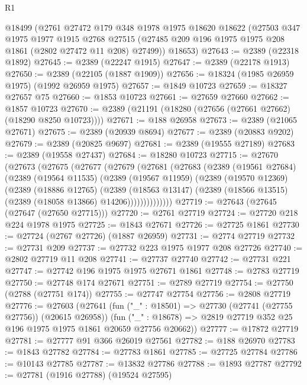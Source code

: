\begin{lexlean}{R1}
\begin{coremodule}
    @18499
    (@2761
      @27472
      @179
      @348
      @1978
      @1975
      @18620
      @18622
      (@27503
        @347
        @1975
        @1977
        @1915
        @2768
        @27515
        (@27485 @209 @196 @1975 @1975 @208 @1861 (@2802 @27472 @11 @208) @27499))
      @18653)
@27643 := @2389 (@22318 @1892)
@27645 := @2389 (@22247 @1915)
@27647 := @2389 (@22178 @1913)
@27650 := @2389 (@22105 (@1887 @1909))
@27656 := @18324 (@1985 @26959 @1975) (@1992 @26959 @1975)
@27657 := @1849 @10723
@27659 := @18327 @27657 @75
@27660 := @1853 @10723
@27661 := @27659 @27660
@27662 := @1857 @10723
@27670 := @2389 (@21191 (@18280 (@27656 (@27661 @27662) (@18290 @8250 @10723))))
@27671 := @188 @26958
@27673 := @2389 (@21065 @27671)
@27675 := @2389 (@20939 @8694)
@27677 := @2389 (@20883 @9202)
@27679 := @2389 (@20825 @9697)
@27681 := @2389 (@19555 @27189)
@27683 := @2389 (@19558 @27437)
@27684 := @18280 @10723
@27715 := @27670
    (@27673
      (@27675
        (@27677
          (@27679
            (@27681
              (@27683
                (@2389
                  (@19561 @27684)
                  (@2389
                    (@19564 @11535)
                    (@2389
                      (@19567 @11959)
                      (@2389
                        (@19570 @12369)
                        (@2389
                          (@18886 @12765)
                          (@2389
                            (@18563 @13147)
                            (@2389 (@18566 @13515) (@2389 (@18058 @13866) @14206))))))))))))))
@27719 := @27643 (@27645 (@27647 (@27650 @27715)))
@27720 := @2761 @27719
@27724 := @27720 @218 @224 @1978 @1975
@27725 := @1843 @27671
@27726 := @27725 @1861
@27730 := @27724 (@2767 @27726) (@1887 @26959)
@27731 := @2774 @27719
@27732 := @27731 @209
@27737 := @27732 @223 @1975 @1977 @208 @27726
@27740 := @2802 @27719 @11 @208
@27741 := @27737 @27740
@27742 := @27731 @221
@27747 := @27742 @196 @1975 @1975 @27671 @1861
@27748 := @2783 @27719
@27750 := @27748 @174 @27671
@27751 := @2789 @27719
@27754 := @27750 (@2788 (@27751 @174))
@27755 := @27747 @27754
@27756 := @2808 @27719
@27776 := @27603
    (@27641
      (fun ("_" : @18501) => @27730 (@27741 (@27755 @27756)) (@20615 @26958))
      (fun ("_" : @18678) => @2819 @27719 @352 @25 @196 @1975 @1975 @1861 @20659 @27756 @20662))
@27777 := @17872 @27719
@27781 := @27777 @91 @366 @26019 @27561
@27782 := @188 @26970
@27783 := @1843 @27782
@27784 := @27783 @1861
@27785 := @27725 @27784
@27786 := @10143 @27785
@27787 := @13832 @27786
@27788 := @1893 @27787
@27792 := @27781 (@1916 @27788) (@19524 @27595)

\end{coremodule}
\end{lexlean}
